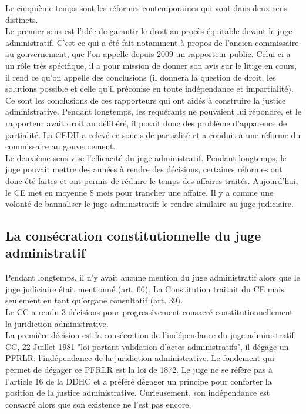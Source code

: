 \documentclass[10pt, a4paper, openany]{book}
\begin{document}
Le cinquième temps sont les réformes contemporaines qui vont dans deux sens distincts.\\ 
Le premier sens est l'idée de garantir le droit au procès équitable devant le juge administratif. C'est ce qui a été fait notamment à propos de l'ancien commissaire au gouvernement, que l'on appelle depuis 2009 un rapporteur public. Celui-ci a un rôle très spécifique, il a pour mission de donner son avis sur le litige en cours, il rend ce qu'on appelle des conclusions (il donnera la question de droit, les solutions possible et celle qu'il préconise en toute indépendance et impartialité). Ce sont les conclusions de ces rapporteurs qui ont aidés à construire la justice administrative. Pendant longtemps, les requérants ne pouvaient lui répondre, et le rapporteur avait droit au délibéré, il posait donc des problème d'apparence de partialité. La CEDH a relevé ce soucis de partialité et a conduit à une réforme du commissaire au gouvernement. \\
Le deuxième sens vise l'efficacité du juge administratif. Pendant longtemps, le juge pouvait mettre des années à rendre des décisions, certaines réformes ont donc été faites et ont permis de réduire le temps des affaires traités. Aujourd'hui, le CE met en moyenne 8 mois pour trancher une affaire. Il y a comme une volonté de bannaliser le juge administratif: le rendre similaire au juge judiciaire. 

\subsection{La consécration constitutionnelle du juge administratif}

Pendant longtemps, il n'y avait aucune mention du juge administratif alors que le juge judiciaire était mentionné (art. 66). La Constitution traitait du CE mais seulement en tant qu'organe consultatif (art. 39). \\
Le CC a rendu 3 décisions pour progressivement consacré constitutionnellement la juridiction administrative. \\
La première décision est la consécration de l'indépendance du juge administratif: CC, 22 Juillet 1981 "loi portant validation d'actes administratifs", il dégage un PFRLR: l'indépendance de la juridiction administrative. Le fondement qui permet de dégager ce PFRLR est la loi de 1872. Le juge ne se réfère pas à l'article 16 de la DDHC et a préféré dégager un principe pour conforter la position de la justice administrative. Curieusement, son indépendance est consacré alors que son existence ne l'est pas encore.
\end{document}
